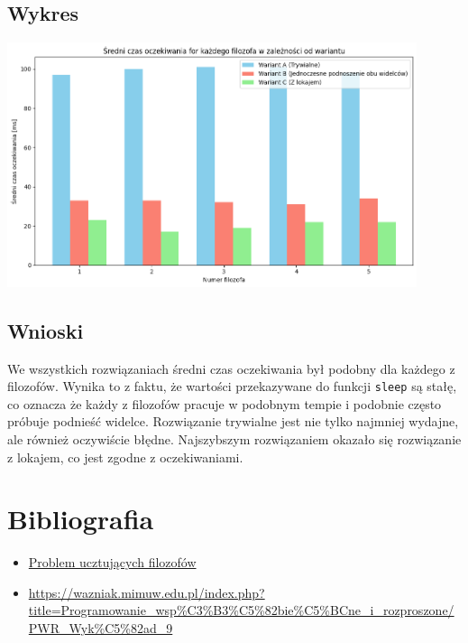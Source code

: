 \documentclass[11pt]{article}
\begin{document}
\subsection*{Wykres}
\label{sec:org4d2a7a2}
\begin{center}
\includegraphics[width=12cm]{./graph.png}
\end{center}
\subsection*{Wnioski}
\label{sec:org70c755e}
We wszystkich rozwiązaniach średni czas oczekiwania był podobny dla każdego z filozofów.
Wynika to z faktu, że wartości przekazywane do funkcji \texttt{sleep} są stałę, co oznacza że
każdy z filozofów pracuje w podobnym tempie i podobnie
często próbuje podnieść widelce.
Rozwiązanie trywialne jest nie tylko najmniej wydajne, ale również oczywiście błędne.
Najszybszym rozwiązaniem okazało się rozwiązanie z lokajem, co jest zgodne z oczekiwaniami.
\section*{Bibliografia}
\label{sec:org1efc06e}
\begin{itemize}
\item \href{https://pl.wikipedia.org/wiki/Problem\_ucztuj\%C4\%85cych\_filozof\%C3\%B3w}{Problem ucztujących filozofów}
\item \url{https://wazniak.mimuw.edu.pl/index.php?title=Programowanie\_wsp\%C3\%B3\%C5\%82bie\%C5\%BCne\_i\_rozproszone/PWR\_Wyk\%C5\%82ad\_9}
\end{itemize}
\end{document}
